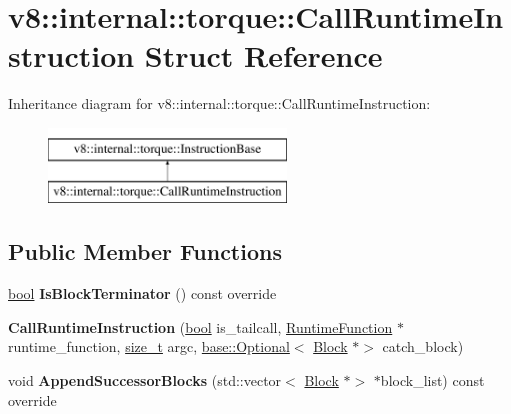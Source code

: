 \hypertarget{structv8_1_1internal_1_1torque_1_1CallRuntimeInstruction}{}\section{v8\+:\+:internal\+:\+:torque\+:\+:Call\+Runtime\+Instruction Struct Reference}
\label{structv8_1_1internal_1_1torque_1_1CallRuntimeInstruction}
Inheritance diagram for v8\+:\+:internal\+:\+:torque\+:\+:Call\+Runtime\+Instruction\+:\begin{figure}[H]
\begin{center}
\leavevmode
\includegraphics[height=2.000000cm]{structv8_1_1internal_1_1torque_1_1CallRuntimeInstruction}
\end{center}
\end{figure}
\subsection*{Public Member Functions}
\begin{DoxyCompactItemize}
\item 
\mbox{\label{structv8_1_1internal_1_1torque_1_1CallRuntimeInstruction_a614b2a6de907fe6bdba25b6240dfb2d0}} 
\mbox{\hyperlink{classbool}{bool}} {\bfseries Is\+Block\+Terminator} () const override
\item 
\mbox{\label{structv8_1_1internal_1_1torque_1_1CallRuntimeInstruction_a8fd2e44a1d01f8103605220643776bdb}} 
{\bfseries Call\+Runtime\+Instruction} (\mbox{\hyperlink{classbool}{bool}} is\+\_\+tailcall, \mbox{\hyperlink{classv8_1_1internal_1_1torque_1_1RuntimeFunction}{Runtime\+Function}} $\ast$runtime\+\_\+function, \mbox{\hyperlink{classsize__t}{size\+\_\+t}} argc, \mbox{\hyperlink{classv8_1_1base_1_1Optional}{base\+::\+Optional}}$<$ \mbox{\hyperlink{classv8_1_1internal_1_1torque_1_1Block}{Block}} $\ast$$>$ catch\+\_\+block)
\item 
\mbox{\label{structv8_1_1internal_1_1torque_1_1CallRuntimeInstruction_a5ba2095c17eaee062ca9c69a148e60f8}} 
void {\bfseries Append\+Successor\+Blocks} (std\+::vector$<$ \mbox{\hyperlink{classv8_1_1internal_1_1torque_1_1Block}{Block}} $\ast$$>$ $\ast$block\+\_\+list) const override
\end{DoxyCompactItemize}
